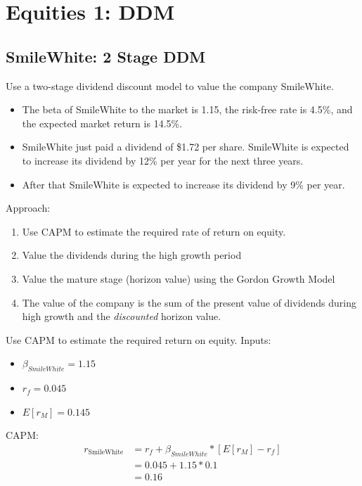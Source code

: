 \documentclass[11pt]{article}
\theoremstyle{definition}
\begin{document}
\section{Equities 1: DDM}

\begin{shaded}
\subsection{SmileWhite: 2 Stage DDM}

    Use a two-stage dividend discount model to value the company SmileWhite.   
    \begin{itemize}
        \item The beta of SmileWhite to the market is 1.15, the risk-free rate is 4.5\%,
     and the expected market return is 14.5\%. 
        \item SmileWhite just paid a dividend of \$1.72 per share.  SmileWhite is expected to increase its dividend by 12\% per year for the next three years.  
        \item After that SmileWhite is expected to increase its dividend by 9\% per year.\\
    \end{itemize}

      Approach:
      \begin{enumerate}
        \item Use CAPM to estimate the required rate of return on equity.
        \item Value the dividends during the high growth period
        \item Value the mature stage (horizon value) using the Gordon Growth Model
        \item The value of the company is the sum of the present value of dividends during high growth and the \textit{discounted} horizon value.
      \end{enumerate}

    Use CAPM to estimate the required return on equity.
    Inputs:
    \begin{itemize}
        \item $\beta_{SmileWhite} = 1.15$
        \item $r_f = 0.045$
        \item $E[r_M] = 0.145$
    \end{itemize}
    \vspace{1em}

    CAPM:
    \begin{align*}
    r_{\text{SmileWhite}} &= r_f + \beta_{SmileWhite} * [E[r_M] - r_f]\\
     &= 0.045 + 1.15*0.1\\
     &= 0.16
    \end{align*}


\end{shaded}
\end{document}
